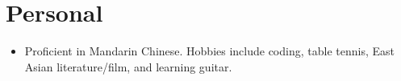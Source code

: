 \documentclass[letterpaper,11pt]{article}
\newcommand{\resumeItem}[1]{
  \item\small{
    {#1} \vspace{-2pt}
  }
}
\newcommand{\resumeSubItem}[2]{\resumeItem{#1}{#2}\vspace{-4pt}}
\newcommand{\resumeSubHeadingListStart}{\begin{itemize}[leftmargin=*]}
\newcommand{\resumeSubHeadingListEnd}{\end{itemize}}
\begin{document}



\section{Personal}
 \resumeSubHeadingListStart
    \resumeSubItem{Proficient in Mandarin Chinese. Hobbies include coding, table tennis, East Asian literature/film, and learning guitar.}{}
 \resumeSubHeadingListEnd
\end{document}

